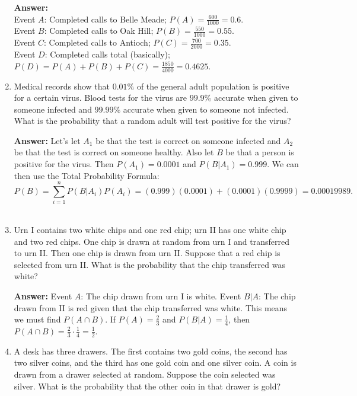 \documentclass{article}
\begin{document}
\begin{enumerate}
        \textbf{Answer:}\\
        Event $A$: Completed calls to Belle Meade; $P(A) = \tfrac{600}{1000} = 0.6$.\\
        Event $B$: Completed calls to Oak Hill; $P(B) = \tfrac{550}{1000} = 0.55$.\\
        Event $C$: Completed calls to Antioch; $P(C) = \tfrac{700}{2000} = 0.35$.\\
        Event $D$: Completed calls total (basically); $P(D) = P(A)+P(B)+P(C) = \tfrac{1850}{4000} = 0.4625$.\\
            
        \item Medical records show that $0.01\%$ of the general adult population is positive for a certain virus. Blood tests for the virus are $99.9\%$ accurate when given to someone infected and $99.99\%$ accurate when given to someone not infected. What is the probability that a random adult will test positive for the virus?
        
        \textbf{Answer:} Let's let $A_1$ be that the test is correct on someone infected and $A_2$ be that the test is correct on someone healthy. Also let $B$ be that a person is positive for the virus. Then $P(A_1) = 0.0001$ and $P(B|A_1) = 0.999$. We can then use the Total Probability Formula:
            \[P(B) = \sum_{i=1}^{n}P(B|A_i)P(A_i) = (0.999)(0.0001)+(0.0001)(0.9999)=0.00019989.\]\\
    
        \item Urn I contains two white chips and one red chip; urn II has one white chip and two red chips. One chip is drawn at random from urn I and transferred to urn II. Then one chip is drawn from urn II. Suppose that a red chip is selected from urn II. What is the probability that the chip transferred was white?
        
        \textbf{Answer:} Event $A$: The chip drawn from urn I is white. Event $B|A$: The chip drawn from II is red given that the chip transferred was white. This means we must find $P(A \cap B)$. If $P(A) = \tfrac{2}{3}$ and $P(B|A) = \tfrac{1}{4}$, then $P(A \cap B) = \tfrac{2}{3} \cdot \tfrac{1}{4} = \tfrac{1}{2}$.\\
        
        \item A desk has three drawers. The first contains two gold coins, the second has two silver coins, and the third has one gold coin and one silver coin. A coin is drawn from a drawer selected at random. Suppose the coin selected was silver. What is the probability that the other coin in that drawer is gold?
        

\end{enumerate}
\end{document}
